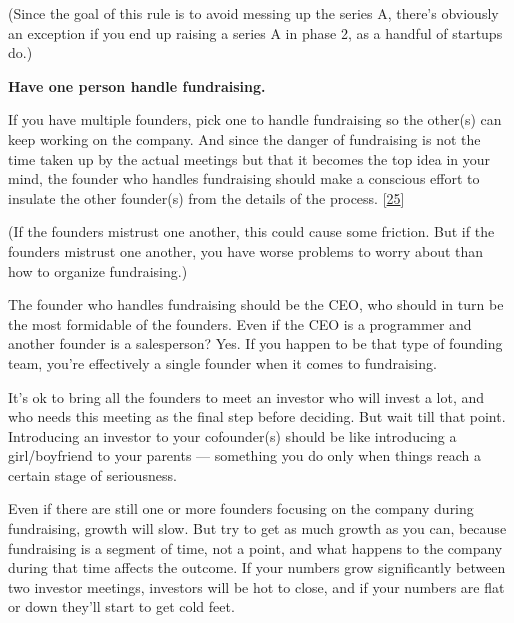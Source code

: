 (Since the goal of this rule is
                    to avoid messing up the series A, there's obviously an
                    exception if you end up raising a series A in phase 2, as a
                    handful of startups do.)


                    \textbf{Have one person handle fundraising.}

If you
                    have multiple founders, pick one to handle fundraising so
                    the other(s) can keep working on the company. And since the
                    danger of fundraising is not the time taken up by the actual
                    meetings but that it becomes the top idea in your mind, the
                    founder who handles fundraising should make a conscious
                    effort to insulate the other founder(s) from the details of
                    the process.
                    [\href{\#f25n}{25}]

(If the founders mistrust one another, this
                    could cause some friction. But if the founders mistrust one
                    another, you have worse problems to worry about than how to
                    organize fundraising.)

The founder who handles
                    fundraising should be the CEO, who should in turn be the
                    most formidable of the founders. Even if the CEO is a
                    programmer and another founder is a salesperson? Yes. If you
                    happen to be that type of founding team, you're effectively
                    a single founder when it comes to fundraising.

It's
                    ok to bring all the founders to meet an investor who will
                    invest a lot, and who needs this meeting as the final step
                    before deciding. But wait till that point. Introducing an
                    investor to your cofounder(s) should be like introducing a
                    girl/boyfriend to your parents --- something you do only
                    when things reach a certain stage of seriousness.

Even
                    if there are still one or more founders focusing on the
                    company during fundraising, growth will slow. But try to get
                    as much growth as you can, because fundraising is a segment
                    of time, not a point, and what happens to the company during
                    that time affects the outcome. If your numbers grow
                    significantly between two investor meetings, investors will
                    be hot to close, and if your numbers are flat or down
                    they'll start to get cold feet.


